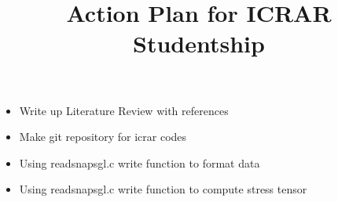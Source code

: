 \documentclass[11pt,a4paper]{article}
\title{Action Plan for ICRAR Studentship}
\begin{document}
\maketitle

\begin{itemize}
\item Write up Literature Review with references
\item Make git repository for icrar codes
\item Using readsnapsgl.c write function to format data
\item Using readsnapsgl.c write function to compute stress tensor
\end{itemize}
\end{document}
